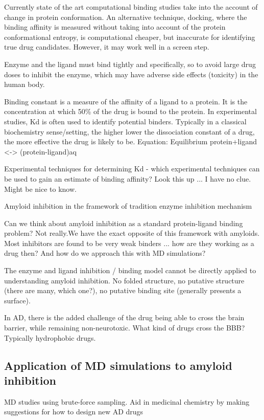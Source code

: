   \2 Currently state of the art computational binding studies take into the account of change in protein conformation.  An alternative technique, docking, where the binding affinity is measured without taking into account of the protein conformational entropy, is computational cheaper, but inaccurate for identifying true drug candidates.  However, it may work well in a screen step.

  \2 Enzyme and the ligand must bind tightly and specifically, so to avoid large drug doses to inhibit the enzyme, which may have adverse side effects (toxicity) in the human body.

  \2 Binding constant is a measure of the affinity of a ligand to a protein. It is the concentration at which 50\% of the drug is bound to the protein. In experimental studies, Kd is often used to identify potential binders. Typically in a classical biochemistry sense/setting, the higher lower the dissociation constant of a drug, the more effective the drug is likely to be.
    \3 Equation: Equilibrium protein+ligand <-> (protein-ligand)aq

  \2 Experimental techniques for determining Kd - which experimental techniques can be used to gain an estimate of binding affinity?
   \3 Look this up ... I have no clue.  Might be nice to know.

  \2 Amyloid inhibition in the framework of tradition enzyme inhibition mechanism

    \3 Can we think about amyloid inhibition as a standard protein-ligand binding problem? Not really.We have the exact opposite of this framework with amyloids. Most inhibitors are found to be very weak binders ... how are they working as a drug then? And how do we approach this with MD simulations?

    \3 The enzyme and ligand inhibition / binding model cannot be directly applied to understanding amyloid inhibition.  No folded structure, no putative structure (there are many, which one?), no putative binding site (generally presents a surface).

    \3 In AD, there is the added challenge of the drug being able to cross the brain barrier, while remaining non-neurotoxic.  What kind of drugs cross the BBB?  Typically hydrophobic drugs.
    
\subsection{Application of MD simulations to amyloid inhibition}
MD studies using brute-force sampling. Aid in medicinal chemistry by making suggestions for how to design new AD drugs

